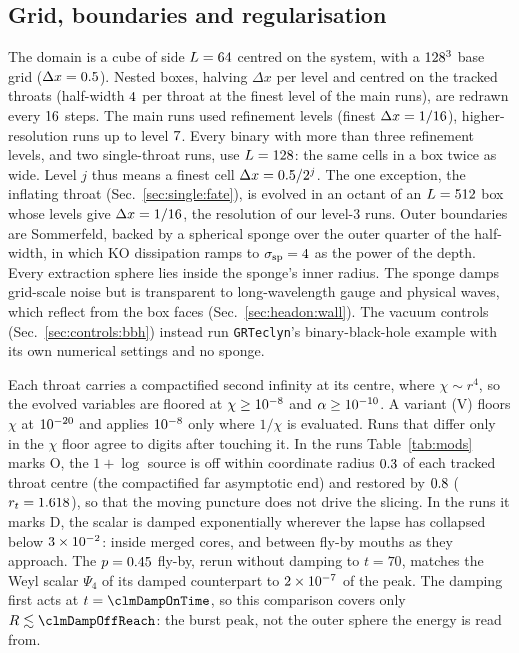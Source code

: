 \documentclass[twocolumn,floatfix,aps,prd,superscriptaddress,nofootinbib]{revtex4-2}
\begin{document}
\subsection{Grid, boundaries and regularisation}
\label{sec:setup:grid}

The domain is a cube of side $L=64$ centred on the system, with a $128^3$ base grid ($\Delta x=0.5$). Nested boxes, halving $\Delta x$ per level and centred on the tracked throats (half-width $4$ per throat at the finest level of the main runs), are redrawn every $16$ steps. The main runs used \clmProdLevels{} refinement levels (finest $\Delta x=1/16$), higher-resolution runs up to level $7$. Every binary with more than three refinement levels, and two single-throat runs, use $L=128$: the same cells in a box twice as wide. Level $j$ thus means a finest cell $\Delta x=0.5/2^j$. The one exception, the inflating throat (Sec.~\ref{sec:single:fate}), is evolved in an octant of an $L=512$ box whose \clmFourLevel{} levels give $\Delta x=1/16$, the resolution of our level-3 runs. Outer boundaries are Sommerfeld, backed by a spherical sponge over the outer quarter of the half-width, in which KO dissipation ramps to $\sigma_{\rm sp}=4$ as the \clmSpongePower{} power of the depth. Every extraction sphere lies inside the sponge's inner radius. The sponge damps grid-scale noise but is transparent to long-wavelength gauge and physical waves, which reflect from the box faces (Sec.~\ref{sec:headon:wall}). The vacuum controls (Sec.~\ref{sec:controls:bbh}) instead run \texttt{GRTeclyn}'s binary-black-hole example with its own numerical settings and no sponge.

Each throat carries a compactified second infinity at its centre, where $\chi\sim r^4$, so the evolved variables are floored at $\chi\ge10^{-8}$ and $\alpha\ge10^{-10}$. A variant (V) floors $\chi$ at $10^{-20}$ and applies $10^{-8}$ only where $1/\chi$ is evaluated. Runs that differ only in the $\chi$ floor agree to \clmControlChiDigits{} digits after touching it. In the runs Table~\ref{tab:mods} marks O, the $1{+}\log$ source is off within coordinate radius $0.3$ of each tracked throat centre (the compactified far asymptotic end) and restored by $0.8$ ($r_t=1.618$), so that the moving puncture does not drive the slicing. In the runs it marks D, the scalar is damped exponentially wherever the lapse has collapsed below $3\times10^{-2}$: inside merged cores, and between fly-by mouths as they approach. The $p=0.45$ fly-by, rerun without damping to $t=70$, matches the Weyl scalar $\Psi_4$ of its damped counterpart to $2\times10^{-7}$ of the peak. The damping first acts at $t=\clmDampOnTime$, so this comparison covers only $R\lesssim\clmDampOffReach$: the burst peak, not the outer sphere the energy is read from.
\end{document}
